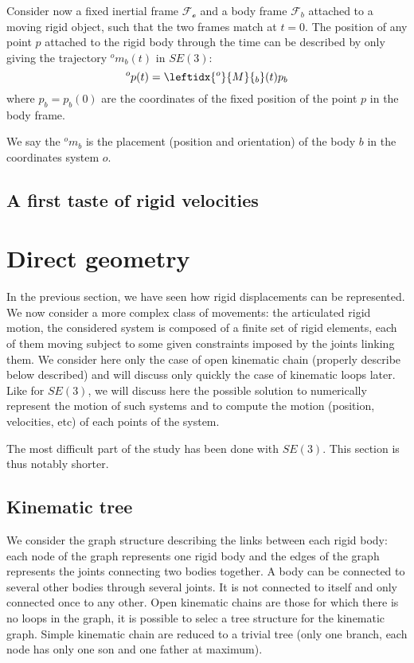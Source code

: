 \documentclass{book}
\begin{document}
Consider now a fixed inertial frame $\mathcal{F_o}$ and a body frame $\mathcal{F}_b$ attached to a moving rigid object, such that the two frames match at $t=0$. The  position of any point $p$ attached to the rigid body through the time can be described by only giving the trajectory $^om_b(t)$ in $SE(3)$:
\[ ^op(t)  = \leftidx{^o}{M}{_b}(t) p_b\]
where $p_b = p_b(0)$ are the coordinates of the fixed position of the point $p$ in the body frame.

We say the $^om_b$ is the placement (\mie position and orientation) of the body $b$ in the coordinates system $o$.

\section{A first taste of rigid velocities}

\chapter{Direct geometry} \label{sec:directgeom}

In the previous section, we have seen how rigid displacements can be represented. We now consider a more complex class of movements: the articulated rigid motion, \mie the considered system is composed of a finite set of rigid elements, each of them moving subject to some given  constraints imposed by the joints linking them. We consider here only the case of open kinematic chain (properly describe below described) and will discuss only quickly the case of kinematic loops later.  Like for $SE(3)$, we will discuss here the possible solution to numerically represent the motion of such systems and to compute the motion (position, velocities, etc) of each points of the system.

The most difficult part of the study has been done with $SE(3)$. This section is thus notably shorter.

\section{Kinematic tree}

We consider the graph structure describing the links between each rigid body: each node of the graph represents one rigid body and the edges of the graph represents the joints connecting two bodies together. A body can be connected to several other bodies through several joints. It is not connected to itself and only connected once to any other. Open kinematic chains are those for which there is no loops in the graph, \mie it is possible to selec a tree structure for the kinematic graph. Simple kinematic chain are reduced to a trivial tree (only one branch, each node has only one son and one father at maximum).
\end{document}
